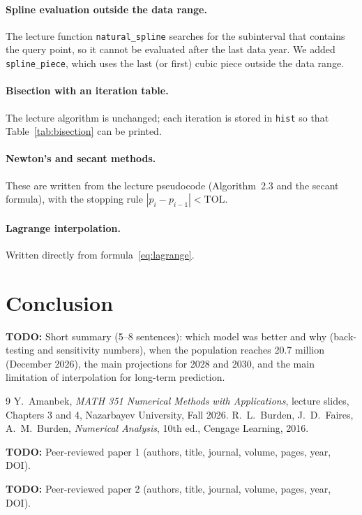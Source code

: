 \documentclass[11pt,a4paper]{article}
\newcommand{\TODO}[1]{\par\smallskip\noindent\colorbox{yellow!35}{%
  \parbox{\dimexpr\linewidth-2\fboxsep}{\small\textbf{TODO:} #1}}\par\smallskip}
\begin{document}
\paragraph{Spline evaluation outside the data range.}
The lecture function \texttt{natural\_spline} searches for the subinterval that
contains the query point, so it cannot be evaluated after the last data year. We
added \texttt{spline\_piece}, which uses the last (or first) cubic piece outside
the data range.



\paragraph{Bisection with an iteration table.}
The lecture algorithm is unchanged; each iteration is stored in \texttt{hist} so
that Table~\ref{tab:bisection} can be printed.


\paragraph{Newton's and secant methods.}
These are written from the lecture pseudocode (Algorithm~2.3 and the secant
formula), with the stopping rule $|p_i-p_{i-1}|<\mathrm{TOL}$.



\paragraph{Lagrange interpolation.}
Written directly from formula~\eqref{eq:lagrange}.


\section{Conclusion}
\TODO{Short summary (5--8 sentences): which model was better and why (back-testing
and sensitivity numbers), when the population reaches 20.7 million (December 2026),
the main projections for 2028 and 2030, and the main limitation of interpolation for
long-term prediction.}

\begin{thebibliography}{9}
 Y.~Amanbek, \emph{MATH 351 Numerical Methods with Applications},
lecture slides, Chapters 3 and 4, Nazarbayev University, Fall 2026.
 R.~L.~Burden, J.~D.~Faires, A.~M.~Burden, \emph{Numerical Analysis},
10th ed., Cengage Learning, 2016.
 \TODO{Peer-reviewed paper 1 (authors, title, journal, volume, pages, year, DOI).}
 \TODO{Peer-reviewed paper 2 (authors, title, journal, volume, pages, year, DOI).}
\end{thebibliography}
\end{document}
